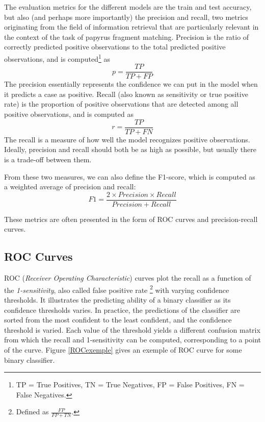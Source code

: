 \documentclass[11pt]{report}
\begin{document}
The evaluation metrics for the different models are the train and test accuracy, but also (and perhaps more importantly) the precision and recall, two metrics originating from the field of information retrieval that are particularly relevant in the context of the task of papyrus fragment matching.\newline
Precision is the ratio of correctly predicted positive observations to the total predicted positive observations, and is computed\footnote{TP = True Positives, TN = True Negatives, FP = False Positives, FN = False Negatives.} as
$$p = \frac{TP}{TP + FP}$$
The precision essentially represents the confidence we can put in the model when it predicts a case as positive. Recall (also known as sensitivity or true positive rate) is the proportion of positive observations that are detected among all positive observations, and is computed as
$$r = \frac{TP}{TP + FN}$$
The recall is a measure of how well the model recognizes positive observations.\newline
Ideally, precision and recall should both be as high as possible, but usually there is a trade-off between them.\newline

From these two measures, we can also define the F1-score, which is computed as a weighted average of precision and recall:
$$F1 = \frac{2 \times Precision \times Recall}{Precision + Recall}$$

These metrics are often presented in the form of ROC curves and precision-recall curves.\newline

\subsection{ROC Curves}

ROC (\emph{Receiver Operating Characteristic}) curves plot the recall as a function of the \emph{1-sensitivity}, also called false positive rate \footnote{Defined as $\frac{FP}{FP + TN}$.} with varying confidence thresholds. It illustrates the predicting ability of a binary classifier as its confidence thresholds varies.\newline
In practice, the predictions of the classifier are sorted from the most confident to the least confident, and the confidence threshold is varied. Each value of the threshold yields a different confusion matrix from which the recall and 1-sensitivity can be computed, corresponding to a point of the curve. Figure \ref{ROCexemple} gives an exemple of ROC curve for some binary classifier.
\end{document}
